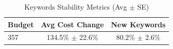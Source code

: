 \begin{table}[htbp]
\centering
\caption{Keywords Stability Metrics (Avg $\pm$ SE)}
\begin{tabular}{lcc}
\toprule
Budget & Avg Cost Change & New Keywords \\
\midrule
357 & 134.5\% $\pm$ 22.6\% & 80.2\% $\pm$ 2.6\% \\
\bottomrule
\end{tabular}
\end{table}